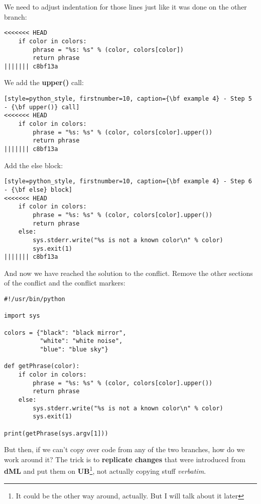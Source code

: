 We need to adjust indentation for those lines just like it was done on the other branch:
\begin{lstlisting}[style=python_style, firstnumber=10, caption={\bf example 4} - Step 4 - Adjust indentation]
<<<<<<< HEAD
    if color in colors:
        phrase = "%s: %s" % (color, colors[color])
        return phrase
||||||| c8bf13a
\end{lstlisting}

We add the {\bf upper()} call:
\begin{lstlisting}[style=python_style, firstnumber=10, caption={\bf example 4} - Step 5 - {\bf upper()} call]
<<<<<<< HEAD
    if color in colors:
        phrase = "%s: %s" % (color, colors[color].upper())
        return phrase
||||||| c8bf13a
\end{lstlisting}

Add the else block:
\begin{lstlisting}[style=python_style, firstnumber=10, caption={\bf example 4} - Step 6 - {\bf else} block]
<<<<<<< HEAD
    if color in colors:
        phrase = "%s: %s" % (color, colors[color].upper())
        return phrase
    else:
        sys.stderr.write("%s is not a known color\n" % color)
        sys.exit(1)
||||||| c8bf13a
\end{lstlisting}
And now we have reached the solution to the conflict. Remove the other sections of the conflict and the conflict markers:

\begin{lstlisting}[style=python_style, caption={\bf example 4} - final]
#!/usr/bin/python

import sys

colors = {"black": "black mirror",
          "white": "white noise",
          "blue": "blue sky"}

def getPhrase(color):
    if color in colors:
        phrase = "%s: %s" % (color, colors[color].upper())
        return phrase
    else:
        sys.stderr.write("%s is not a known color\n" % color)
        sys.exit(1)

print(getPhrase(sys.argv[1]))
\end{lstlisting}

But then, if we can't copy over code from any of the two branches, how do we work around it? The trick is to {\bf replicate changes}
that were introduced from {\bf dML} and put them on {\bf UB}\footnote{It could be the other way around, actually. But I will talk about
it later}, not actually copying stuff {\it verbatim}.

